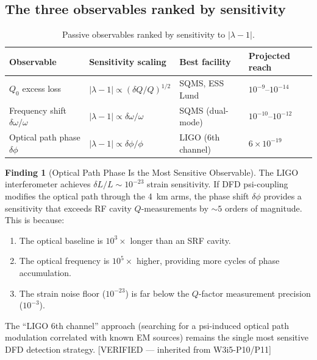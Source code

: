 \documentclass[11pt]{article}
\newcommand{\lam}{\lambda}
\newcommand{\ee}[1]{\times 10^{#1}}
\newcommand{\lbone}{|\lam - 1|}
\theoremstyle{definition}
\newtheorem{finding}[theorem]{Finding}
\theoremstyle{remark}
\begin{document}
\subsection{The three observables ranked by sensitivity}
\label{ssec:three_observables}

\begin{table}[H]
\centering
\caption{Passive observables ranked by sensitivity to $\lbone$.}
\label{tab:passive_observables}
\renewcommand{\arraystretch}{1.2}
\begin{tabular}{@{}llll@{}}
\toprule
\textbf{Observable} & \textbf{Sensitivity scaling} &
  \textbf{Best facility} & \textbf{Projected reach} \\
\midrule
$Q_0$ excess loss & $\lbone \propto (\delta Q/Q)^{1/2}$
  & SQMS, ESS Lund & $10^{-9}$--$10^{-14}$ \\
Frequency shift $\delta\omega/\omega$ & $\lbone \propto \delta\omega/\omega$
  & SQMS (dual-mode) & $10^{-10}$--$10^{-12}$ \\
Optical path phase $\delta\phi$ & $\lbone \propto \delta\phi/\phi$
  & LIGO (6th channel) & $6\ee{-19}$ \\
\bottomrule
\end{tabular}
\end{table}

\begin{finding}[Optical Path Phase Is the Most Sensitive Observable]
\label{find:optical_best}
The LIGO interferometer achieves $\delta L/L \sim 10^{-23}$ strain
sensitivity. If DFD psi-coupling modifies the optical path through the
4~km arms, the phase shift $\delta\phi$ provides a sensitivity that
exceeds RF cavity $Q$-measurements by $\sim 5$ orders of magnitude.
This is because:
\begin{enumerate}[nosep]
\item The optical baseline is $10^3\times$ longer than an SRF cavity.
\item The optical frequency is $10^5\times$ higher, providing more
  cycles of phase accumulation.
\item The strain noise floor ($10^{-23}$) is far below the $Q$-factor
  measurement precision ($10^{-3}$).
\end{enumerate}
The ``LIGO 6th channel'' approach (searching for a psi-induced optical
path modulation correlated with known EM sources) remains the single
most sensitive DFD detection strategy. [VERIFIED --- inherited from
W3i5-P10/P11]
\end{finding}

\end{document}
